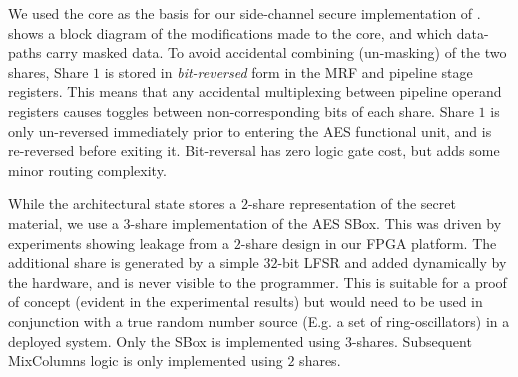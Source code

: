 We used the  core as the basis for our side-channel secure
implementation of .
 shows a block diagram of the modifications
made to the core, and which data-paths carry masked data.
To avoid accidental combining (un-masking) of the two shares,
Share $1$ is stored in {\em bit-reversed} form in the MRF and pipeline
stage registers.
This means that any accidental multiplexing between pipeline operand
registers causes toggles between non-corresponding bits of each share.
Share $1$ is only un-reversed immediately prior to entering the
AES functional unit, and is re-reversed before exiting it.
Bit-reversal has zero logic gate cost, but adds some minor routing
complexity.

While the architectural state stores a $2$-share representation
of the secret material, we use a $3$-share implementation of the
AES SBox.
This was driven by experiments showing 
leakage from a $2$-share design in our FPGA platform.
The additional share is generated by a simple $32$-bit LFSR and added
dynamically by the hardware, and is never visible to the programmer.
This is suitable for a proof of concept (evident in the experimental
results) but would need to be used in conjunction with a true random
number source (E.g. a set of ring-oscillators) in a deployed system.
Only the SBox is implemented using $3$-shares.
Subsequent MixColumns logic is only implemented using $2$ shares.

